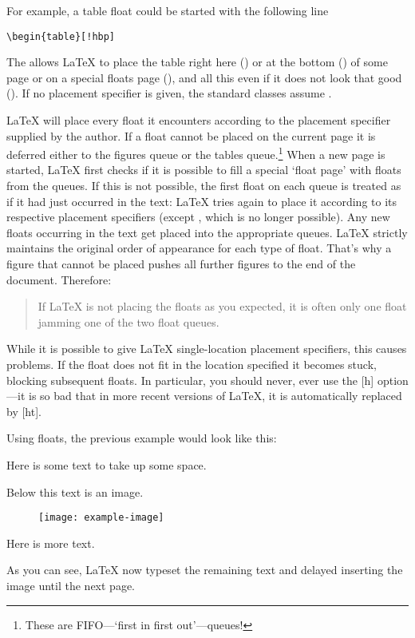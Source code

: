 For example, a table float could be started with the following line
\begin{code}
\verb|\begin{table}[!hbp]|
\end{code}
The  \cargv{[!hbp]} allows \LaTeX{} to
place the table right here () or at the bottom ()
of some page
or on a special floats page (), and all this even if it does not
look that good (\cargv{!}). If no placement specifier is given, the standard
classes assume \cargv{[tbp]}.

\LaTeX{} will place every float it encounters according to the placement
specifier supplied by the author. If a float cannot be placed on the current
page it is deferred either to the figures queue or the tables
queue.\footnote{These are FIFO---`first in first out'---queues!}  When a new
page is started, \LaTeX{} first checks if it is possible to fill a special
\enquote*{float page} with floats from the queues. If this is not possible, the
first float on each queue is treated as if it had just occurred in the text:
\LaTeX{} tries again to place it according to its respective placement
specifiers (except , which is no longer possible).  Any new floats
occurring in the text get placed into the appropriate queues. \LaTeX{} strictly
maintains the original order of appearance for each type of float. That's why a
figure that cannot be placed pushes all further figures to the end of the
document. Therefore:
\begin{quote}
  If \LaTeX{} is not placing the floats as you expected,
  it is often only one float jamming one of the two float queues.
\end{quote}

While it is possible to give \LaTeX{}  single-location placement specifiers,
this causes problems.  If the float does not fit in the location specified it
becomes stuck, blocking subsequent floats. In particular, you should never,
ever use the [h] option---it is so bad that in more recent versions of \LaTeX,
it is automatically replaced by [ht].

Using floats, the previous example would look like this:
\begin{example}[standalone, paperheight=4cm, to_page=2, vertical_pages]
\usepackage{graphicx} %
\geometry{includefoot} %
Here is some text
to take up some space.

Below this text is an image.

\begin{figure}
  \centering
  \texttt{[image: example-image]}
\end{figure}

Here is more text.
\end{example}
As you can see, \LaTeX{} now typeset the remaining text and delayed inserting
the image until the next page.

